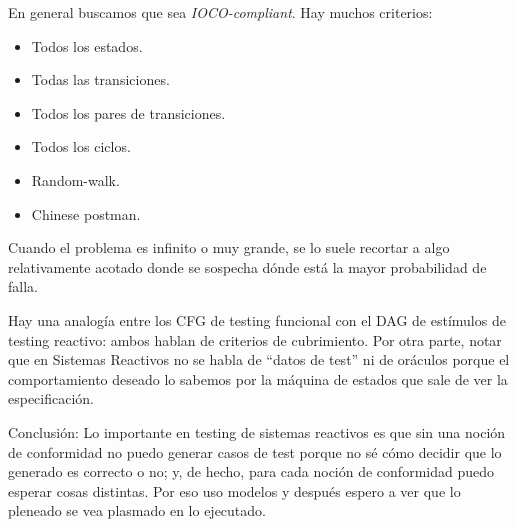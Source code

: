 \documentclass[]{article}
\begin{document}
En general buscamos que sea \textit{IOCO-compliant}. Hay muchos criterios:
\begin{itemize}
	\item Todos los estados.
	\item Todas las transiciones.
	\item Todos los pares de transiciones.
	\item Todos los ciclos.
	\item Random-walk.
	\item Chinese postman.
\end{itemize}

Cuando el problema es infinito o muy grande, se lo suele recortar a algo relativamente acotado donde se sospecha dónde está la mayor probabilidad de falla.

Hay una analogía entre los CFG de testing funcional con el DAG de estímulos de testing reactivo: ambos hablan de criterios de cubrimiento. Por otra parte, notar que en Sistemas Reactivos no se habla de ``datos de test'' ni de oráculos porque el comportamiento deseado lo sabemos por la máquina de estados que sale de ver la especificación.

Conclusión:
Lo importante en testing de sistemas reactivos es que sin una noción de conformidad no puedo generar casos de test porque no sé cómo decidir que lo generado es correcto o no; y, de hecho, para cada noción de conformidad puedo esperar cosas distintas. Por eso uso modelos y después espero a ver que lo pleneado se vea plasmado en lo ejecutado.
\end{document}
